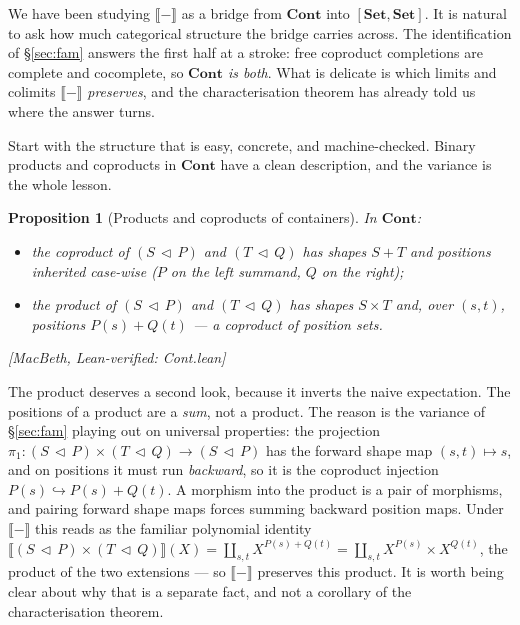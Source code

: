 \documentclass[11pt]{article}
\theoremstyle{plain}
\newtheorem{proposition}[theorem]{Proposition}
\theoremstyle{definition}
\newcommand{\Set}{\mathbf{Set}}
\newcommand{\Cont}{\mathbf{Cont}}
\newcommand{\ext}[1]{\llbracket #1 \rrbracket}
\newcommand{\cont}[2]{(#1\,\triangleleft\,#2)}
\newcommand{\prov}[1]{\hfill\textsf{[#1]}}
\begin{document}
We have been studying $\ext{-}$ as a bridge from $\Cont$ into $[\Set,\Set]$. It is
natural to ask how much categorical structure the bridge carries across. The
identification of \S\ref{sec:fam} answers the first half at a stroke: free coproduct
completions are complete and cocomplete, so \emph{$\Cont$ is both}. What is delicate is
which limits and colimits $\ext{-}$ \emph{preserves}, and the characterisation theorem
has already told us where the answer turns.

Start with the structure that is easy, concrete, and machine-checked. Binary products
and coproducts in $\Cont$ have a clean description, and the variance is the whole
lesson.

\begin{proposition}[Products and coproducts of containers]\label{prop:prodcoprod}
In $\Cont$:
\begin{itemize}
\item the \emph{coproduct} of $\cont SP$ and $\cont TQ$ has shapes $S+T$ and
      positions inherited case-wise ($P$ on the left summand, $Q$ on the right);
\item the \emph{product} of $\cont SP$ and $\cont TQ$ has shapes $S\times T$ and, over
      $(s,t)$, positions $P(s)+Q(t)$ --- a \emph{coproduct} of position sets.
\end{itemize}
\prov{MacBeth, Lean-verified: Cont.lean}
\end{proposition}

The product deserves a second look, because it inverts the naive expectation. The
positions of a product are a \emph{sum}, not a product. The reason is the variance of
\S\ref{sec:fam} playing out on universal properties: the projection $\pi_1\colon
\cont SP\times\cont TQ\to\cont SP$ has the forward shape map $(s,t)\mapsto s$, and on
positions it must run \emph{backward}, so it is the coproduct injection $P(s)\hookrightarrow
P(s)+Q(t)$. A morphism into the product is a pair of morphisms, and pairing forward
shape maps forces summing backward position maps. Under $\ext{-}$ this reads as the
familiar polynomial identity $\ext{\cont SP\times\cont TQ}(X)=\coprod_{s,t}
X^{P(s)+Q(t)}=\coprod_{s,t}X^{P(s)}\times X^{Q(t)}$, the product of the two extensions
--- so $\ext{-}$ preserves this product. It is worth being clear about why that is a
separate fact, and not a corollary of the characterisation theorem.
\end{document}

